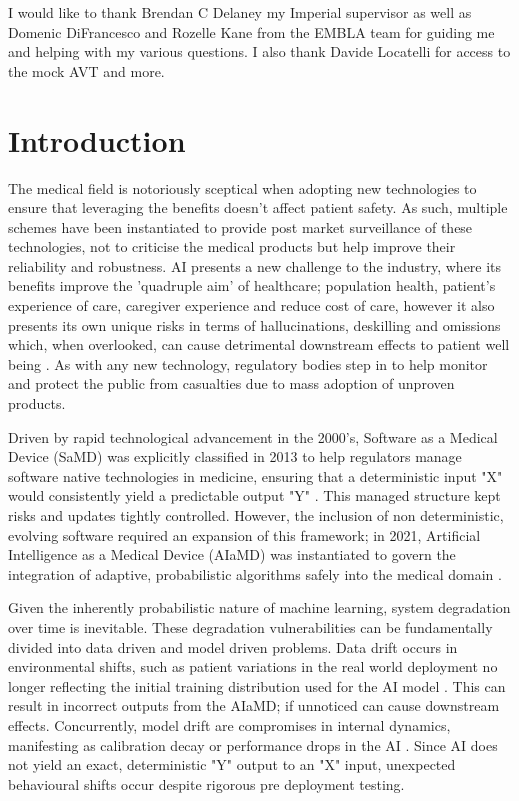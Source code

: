 \documentclass[11pt,a4paper]{article}
\begin{document}
I would like to thank Brendan C Delaney my Imperial supervisor as well as 
Domenic DiFrancesco and  Rozelle Kane from the EMBLA team for guiding me and helping with my various questions.
I also thank Davide Locatelli for access to the mock AVT and more.



\vspace{5mm}
\tableofcontents
\newpage

\section{Introduction}
\label{sec:Introduction}

The medical field is notoriously sceptical when adopting new technologies to ensure that leveraging the benefits doesn't affect patient safety. As such, multiple schemes have been instantiated to provide post market surveillance of these technologies, not to criticise the medical products but help improve their reliability and robustness. AI presents a new challenge to the industry, where its benefits  improve the   'quadruple aim’  of healthcare; population health, patient's experience of care,  caregiver experience and reduce cost of care, \cite{bajwa2021artificial} however it also presents its own unique risks in terms of hallucinations, deskilling and omissions \cite{mhra2025} which, when overlooked, can cause detrimental downstream effects to patient well being \cite{rcr2026} . As with any new technology, regulatory bodies step in to help monitor and protect the public from casualties due to mass adoption of unproven products.

Driven by rapid technological
advancement in the 2000's, Software as a Medical Device (SaMD) was explicitly classified in
2013 to help regulators manage software native technologies in medicine, ensuring that a
deterministic input "X" would consistently yield a predictable output
"Y" \cite{imdrf2013} . This managed structure kept risks and updates tightly
controlled. However, the inclusion of non deterministic, evolving software
required an expansion of this framework; in 2021, Artificial Intelligence as a
Medical Device (AIaMD) was instantiated to govern the integration of adaptive, probabilistic
algorithms safely into the medical domain \cite{mhra2021} \cite{mhra2025} . 

Given the inherently probabilistic nature of machine
learning, system degradation over time is inevitable. These degradation vulnerabilities can be
fundamentally divided into data driven and model driven problems. Data drift
occurs in environmental shifts,  such as  patient variations in the real world
deployment  no longer reflecting the initial training distribution used for the AI  model \cite{kothari2019} . This can result in incorrect outputs from the AIaMD; if unnoticed can cause downstream effects.
Concurrently, model drift are compromises in internal dynamics, manifesting as
calibration decay or performance drops in the AI \cite{guan2026} . Since AI does not
yield an exact, deterministic "Y" output to an "X" input,
unexpected behavioural shifts occur despite rigorous pre deployment testing. 
\end{document}
